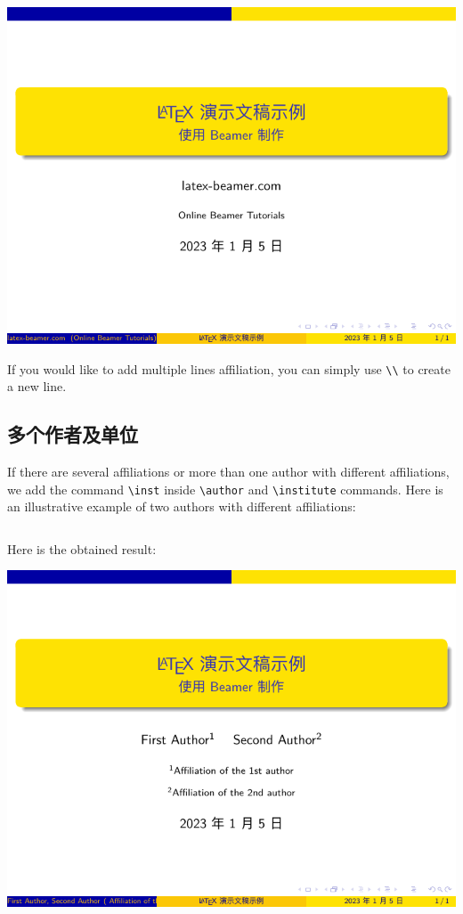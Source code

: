 \includegraphics{examples/beamer/beamertitle03.pdf}

If you would like to add multiple lines affiliation, you can simply use \verb|\\| to create a new line.

\subsection{多个作者及单位}

If there are several affiliations or more than one author with different affiliations, we add the command \verb|\inst| inside \verb|\author| and \verb|\institute| commands. Here is an illustrative example of two authors with different affiliations:

\inputminted[linenos=true]{latex}{examples/beamer/beamertitle04.tex}

Here is the obtained result:

\includegraphics{examples/beamer/beamertitle04.pdf}

